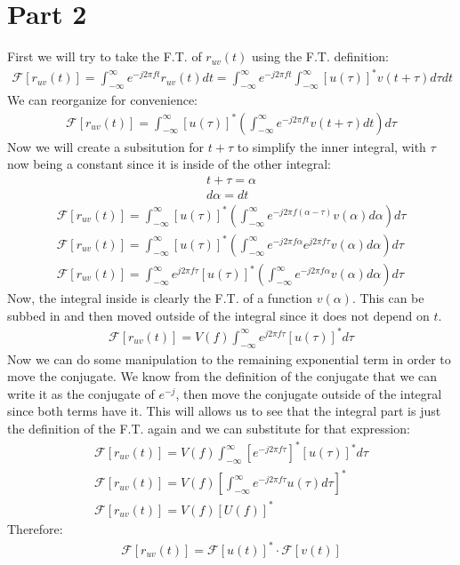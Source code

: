 \documentclass[12 pt]{article}
\begin{document}
\section*{Part 2}
First we will try to take the F.T. of $r_{uv}(t)$ using the F.T. definition:
\begin{align*}
    \mathcal{F}[r_{uv}(t)]=\int_{-\infty}^{\infty}e^{-j2\pi ft}r_{uv}(t)dt=\int_{-\infty}^{\infty}e^{-j2\pi ft}
    \int_{-\infty}^{\infty}[u(\tau)]^*v(t+\tau)d\tau dt
\end{align*}
We can reorganize for convenience:
\begin{align*}
    \mathcal{F}[r_{uv}(t)]=\int_{-\infty}^{\infty}[u(\tau)]^*\left(\int_{-\infty}^{\infty}e^{-j2\pi ft}v(t+\tau)dt\right)d\tau 
\end{align*}
Now we will create a subsitution for $t+\tau$ to simplify the inner integral, with $\tau$ now being a constant since it
is inside of the other integral:
\begin{align*}
    t+\tau = \alpha \\
    d\alpha = dt
\end{align*}
\begin{align*}
    \mathcal{F}[r_{uv}(t)]=\int_{-\infty}^{\infty}[u(\tau)]^*\left(\int_{-\infty}^{\infty}e^{-j2\pi f(\alpha-\tau)}v(\alpha)d\alpha\right)d\tau \\
    \mathcal{F}[r_{uv}(t)]=\int_{-\infty}^{\infty}[u(\tau)]^*\left(\int_{-\infty}^{\infty}e^{-j2\pi f\alpha}e^{j2\pi f\tau}
    v(\alpha)d\alpha\right)d\tau \\
    \mathcal{F}[r_{uv}(t)]=\int_{-\infty}^{\infty}e^{j2\pi f\tau}[u(\tau)]^*\left(\int_{-\infty}^{\infty}e^{-j2\pi f\alpha}
    v(\alpha)d\alpha\right)d\tau
\end{align*}
Now, the integral inside is clearly the F.T. of a function $v(\alpha)$. This can be subbed in and then moved outside of
the integral since it does not depend on $t$.
\begin{align*}
    \mathcal{F}[r_{uv}(t)]=V(f)\int_{-\infty}^{\infty}e^{j2\pi f\tau}[u(\tau)]^*d\tau
\end{align*}
Now we can do some manipulation to the remaining exponential term in order to move the conjugate. We know from the
definition of the conjugate that we can write it as the conjugate of $e^{-j}$, then move the conjugate outside of the
integral since both terms have it. This will allows us to see that the integral part is just the definition of the F.T.
again and we can substitute for that expression:
\begin{align*}
    \mathcal{F}[r_{uv}(t)]=V(f)\int_{-\infty}^{\infty}[e^{-j2\pi f\tau}]^*[u(\tau)]^*d\tau \\
    \mathcal{F}[r_{uv}(t)]=V(f)\left[\int_{-\infty}^{\infty}e^{-j2\pi f\tau}u(\tau)d\tau\right]^* \\
    \mathcal{F}[r_{uv}(t)]=V(f)[U(f)]^*
\end{align*}
Therefore:
\begin{align*}
    \mathcal{F}[r_{uv}(t)]=\mathcal{F}[u(t)]^*\cdot\mathcal{F}[v(t)]
\end{align*}
\end{document}
